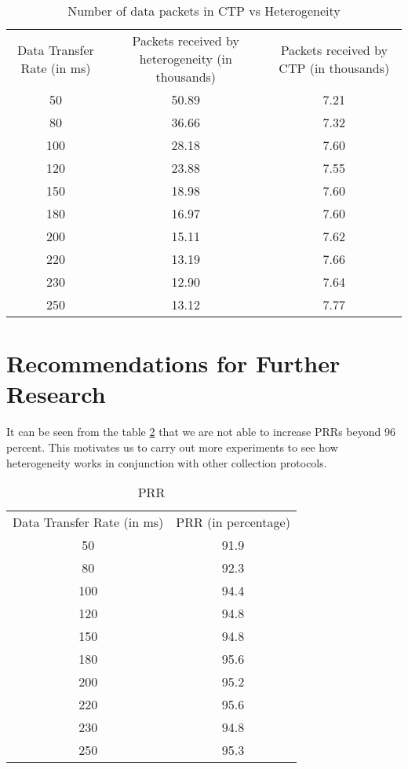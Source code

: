 \begin{table}[h]
\caption{Number of data packets in CTP vs Heterogeneity} %
\centering
\begin{adjustbox}{max width=\textwidth}

	\begin{tabular}{|c|c|c|} 
		\midrule
		Data Transfer Rate (in ms) & Packets received by heterogeneity (in thousands) & Packets received by \ac{CTP} (in thousands) \\
	    
	    50 & 50.89 & 7.21 \\
	    80 & 36.66 & 7.32 \\
	    100 & 28.18 & 7.60 \\
	    120 & 23.88 & 7.55 \\
	    150 & 18.98 & 7.60 \\
	    180 & 16.97 & 7.60 \\
	    200 & 15.11 & 7.62 \\
	    220 & 13.19 & 7.66 \\
	    230 & 12.90 & 7.64 \\
	    250 & 13.12 & 7.77 \\
		\hline
		\end{tabular}
\end{adjustbox} 	
\label{tab:ProcessedvsUnprocessedData}
\end{table}


\section{Recommendations for Further Research}

It can be seen from the table \ref{tab:PRRinHeterogeneity} that we are not able to increase \acp{PRR} beyond 96 percent. This motivates us to carry out more experiments to see how heterogeneity works in conjunction with other collection protocols. 
    
\begin{table}[h]
\caption{PRR} %
\centering
\begin{adjustbox}{max width=\textwidth}

	\begin{tabular}{|c|c|} 
		\midrule
		Data Transfer Rate (in ms) & \ac{PRR} (in percentage) \\
	    50 & 91.9 \\
	    80 & 92.3 \\
	    100 & 94.4 \\
	    120 & 94.8 \\
	    150 & 94.8 \\
	    180 & 95.6 \\
	    200 & 95.2 \\
	    220 & 95.6 \\
	    230 & 94.8 \\
	    250 & 95.3 \\
		\hline
		\end{tabular}
\end{adjustbox} 	
\label{tab:PRRinHeterogeneity}
\end{table}

